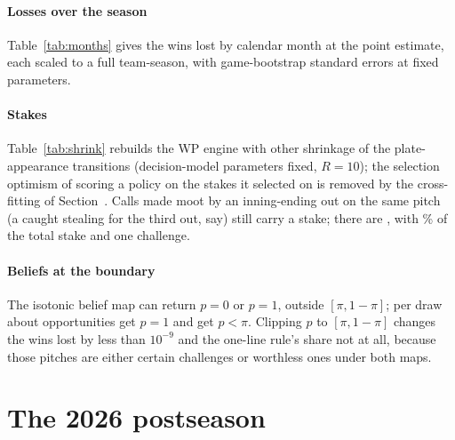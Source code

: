 \documentclass[aoas]{imsart}
\theoremstyle{plain}
\theoremstyle{definition}
\begin{document}
\paragraph{Losses over the season} Table~\ref{tab:months} gives the wins lost by calendar month at the point estimate,
each scaled to a full team-season, with game-bootstrap standard errors at fixed parameters.
\begin{table}[!htbp]
\caption{Wins lost per team-season equivalent by period (comparator, $R=\PointR$ draws).}\label{tab:months}
\centering\small
\resizebox{\textwidth}{!}{}
\end{table}

\paragraph{Stakes} Table~\ref{tab:shrink} rebuilds the WP engine with other shrinkage of the plate-appearance
transitions (decision-model parameters fixed, $R=10$); the selection optimism of scoring a policy on the stakes it selected
on is removed by the cross-fitting of Section~. Calls made moot by an inning-ending out on the same
pitch (a caught stealing for the third out, say) still carry a stake; there are \MootN{}, with \MootStakePct\% of the total stake and one challenge.
\begin{table}[!htbp]
\caption{Engine shrinkage: wins lost, the one-line rule's share and the called pitches (and distinct engine states)
in which a ball is worth less than a strike to the batting team.}\label{tab:shrink}
\centering\small
\resizebox{\textwidth}{!}{}
\end{table}

\paragraph{Beliefs at the boundary} The isotonic belief map can return $p=0$ or $p=1$, outside $[\pi,1-\pi]$; per draw
about \PClipOne{} opportunities get $p=1$ and \PClipBelowPi{} get $p<\pi$. Clipping $p$ to $[\pi,1-\pi]$ changes the
wins lost by less than $10^{-9}$ and the one-line rule's share not at all, because those pitches are either certain
challenges or worthless ones under both maps.

\section{The 2026 postseason}\label{sec:postseason}
\end{document}
